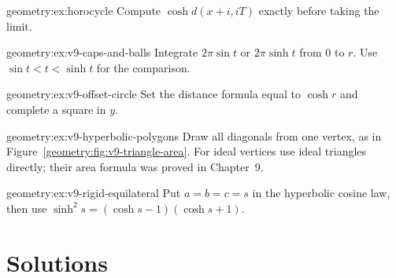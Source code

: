 \begin{hint}{geometry:ex:horocycle}
Compute $\cosh d(x+i,iT)$ exactly before taking the limit.
\end{hint}
\begin{hint}{geometry:ex:v9-caps-and-balls}
Integrate $2\pi\sin t$ or $2\pi\sinh t$ from $0$ to $r$.
Use $\sin t<t<\sinh t$ for the comparison.
\end{hint}
\begin{hint}{geometry:ex:v9-offset-circle}
Set the distance formula equal to $\cosh r$ and complete a square in $y$.
\end{hint}
\begin{hint}{geometry:ex:v9-hyperbolic-polygons}
Draw all diagonals from one vertex, as in
Figure~\ref{geometry:fig:v9-triangle-area}. For ideal vertices use ideal
triangles directly; their area formula was proved in Chapter~9.
\end{hint}
\begin{hint}{geometry:ex:v9-rigid-equilateral}
Put $a=b=c=s$ in the hyperbolic cosine law, then use
$\sinh^2s=(\cosh s-1)(\cosh s+1)$.
\end{hint}

\section{Solutions}

